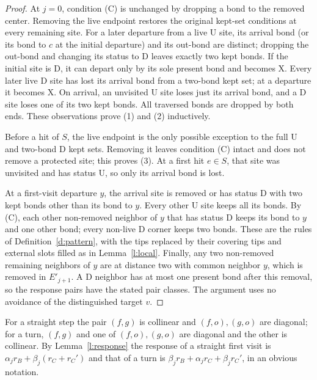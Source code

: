 \begin{proof}
At $j=0$, condition (C) is unchanged by dropping a bond to the
removed center. Removing the live endpoint restores the original
kept-set conditions at every remaining site. For a later departure
from a live $\mathrm U$ site, its arrival bond (or its bond to $c$
at the initial departure) and its out-bond are distinct; dropping the
out-bond and changing its status to $\mathrm D$ leaves exactly two
kept bonds. If the initial site is $\mathrm D$, it can depart only
by its sole present bond and becomes $\mathrm X$. Every later live
$\mathrm D$ site has lost its arrival bond from a two-bond kept set;
at a departure it becomes $\mathrm X$. On arrival, an unvisited
$\mathrm U$ site loses just its arrival bond, and a $\mathrm D$
site loses one of its two kept bonds. All traversed bonds are dropped
by both ends. These observations prove (1) and (2) inductively.

Before a hit of $S$, the live endpoint is the only possible exception
to the full $\mathrm U$ and two-bond $\mathrm D$ kept sets. Removing
it leaves condition (C) intact and does not remove a protected site;
this proves (3). At a first hit $e\in S$, that site was unvisited
and has status $\mathrm U$, so only its arrival bond is lost.

At a first-visit departure $y$, the arrival site is removed or has
status $\mathrm D$ with two kept bonds other than its bond to $y$.
Every other $\mathrm U$ site keeps all its bonds. By (C), each
other non-removed neighbor of $y$ that has status $\mathrm D$
keeps its bond to $y$ and one other bond; every non-live
$\mathrm D$ corner keeps two bonds. These are the rules of
Definition~\ref{d:pattern}, with the tips replaced by their covering
tips and external slots filled as in Lemma~\ref{l:local}. Finally,
any two non-removed remaining neighbors of $y$ are at distance two
with common neighbor $y$, which is removed in $E'_{j+1}$.
A $\mathrm D$ neighbor has at most one present bond after this
removal, so the response pairs have the stated pair classes.
The argument uses no avoidance of the distinguished target $v$.
\end{proof}

For a straight step the pair $(f, g)$ is collinear and $(f, o), (g, o)$ are diagonal; for a turn, $(f, g)$ and one of $(f, o), (g, o)$ are diagonal and the other is collinear. By Lemma~\ref{l:response} the response of a straight first visit is $\alpha_j r_B + \beta_j(r_C + r_C')$ and that of a turn is $\beta_j r_B + \alpha_j r_C + \beta_j r_C'$, in an obvious notation.

